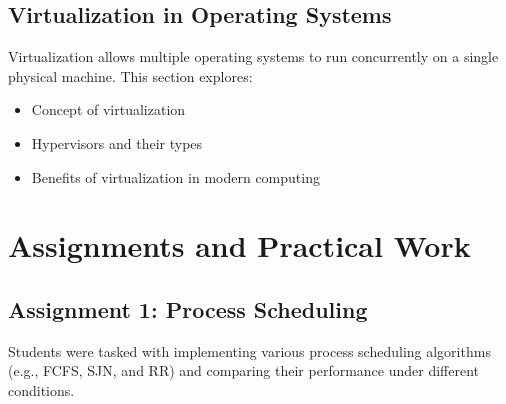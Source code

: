 \documentclass[12pt]{article}
\begin{document}
\subsection{Virtualization in Operating Systems}
Virtualization allows multiple operating systems to run concurrently on a
single physical machine. This section explores:
\begin{itemize}
    \item Concept of virtualization
    \item Hypervisors and their types
    \item Benefits of virtualization in modern computing
\end{itemize}

\section{Assignments and Practical Work}
\subsection{Assignment 1: Process Scheduling}
Students were tasked with implementing various process scheduling algorithms
(e.g., FCFS, SJN, and RR) and comparing their performance under different
conditions.
\end{document}
